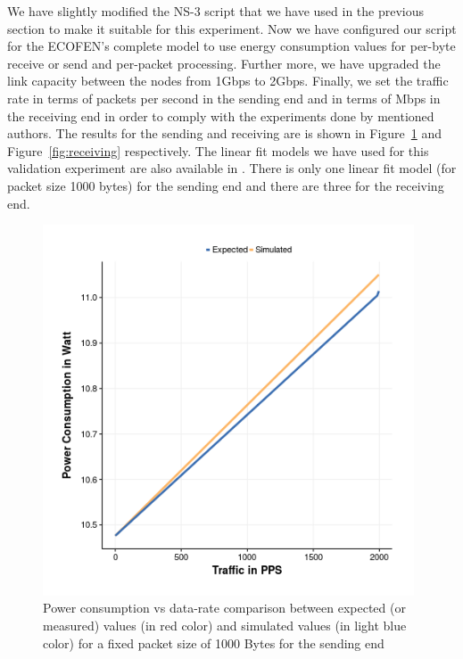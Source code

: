 We have slightly modified the NS-3 script that we have used in the previous section to make it suitable for this experiment. Now we have configured our script for the ECOFEN's complete model to use energy consumption values for per-byte receive or send and per-packet processing. Further more, we have upgraded the link capacity between the nodes from 1Gbps to 2Gbps. Finally, we set the traffic rate  in terms of packets per second in the sending end and in terms of Mbps in the receiving end in order to comply with the experiments done by mentioned authors. The results for the sending and receiving are is shown in Figure~\ref{fig:sending} and Figure~\ref{fig:receiving} respectively. The linear fit models we have used for this validation experiment are also available in \cite{Sivaraman}. There is only one linear fit model (for packet size 1000 bytes) for the sending end and there are three for the receiving end.   
\begin{figure}[ht]
	\begin{center}
		\includegraphics[width=11cm]{images/expectedvssimulatedsending.png}
		\caption{Power consumption vs data-rate comparison between expected (or measured) values (in red color) and simulated values (in light blue color) for a fixed packet size of 1000 Bytes for the sending end}
		\label{fig:sending}
	\end{center}
\end{figure}



